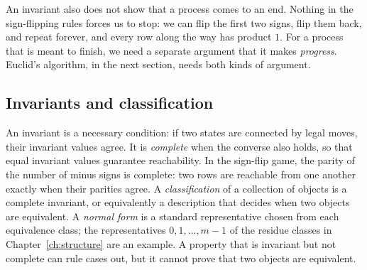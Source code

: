 An invariant also does not show that a process comes to an end. Nothing in the sign-flipping rules forces us to stop: we can flip the first two signs, flip them back, and repeat forever, and every row along the way has product $1$. For a process that is meant to finish, we need a separate argument that it makes \emph{progress}. Euclid's algorithm, in the next section, needs both kinds of argument.

\subsection*{Invariants and classification}
An invariant is a necessary condition: if two states are connected by legal moves, their invariant values agree. It is \emph{complete} when the converse also holds, so that equal invariant values guarantee reachability. In the sign-flip game, the parity of the number of minus signs is complete: two rows are reachable from one another exactly when their parities agree. A \emph{classification} of a collection of objects is a complete invariant, or equivalently a description that decides when two objects are equivalent. A \emph{normal form} is a standard representative chosen from each equivalence class; the representatives $0,1,\ldots,m-1$ of the residue classes in Chapter~\ref{ch:structure} are an example. A property that is invariant but not complete can rule cases out, but it cannot prove that two objects are equivalent.
